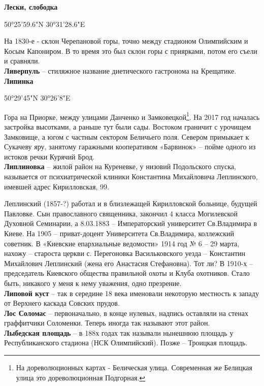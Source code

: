 \textbf{Лески, слободка}

50°25'59.6"N 30°31'28.6"E

На 1830-е - склон Черепановой горы, точно между стадионом Олимпийским и Косым Капониром. В то время это был склон горы с приярками, потом его съели и сравняли.\\

\textbf{Ливерпуль} – стиляжное название диетического гастронома на Крещатике.\\

\textbf{Липинка}

50°29'45"N 30°26'8"E

Гора на Приорке, между улицами Данченко и Замковецкой\footnote{На дореволюционных картах - Белическая улица. Современная же Белицкая улица это дореволюционная Подгорная.}. На 2017 год началась застройка высотками, а раньше тут были сады. Востоком граничит с урочищем Замковище, а югом с частным сектором Беличьего поля. Севером примыкает к Сукачеву яру, занятому гаражными кооперативом «Барвинок» – пойме одного из истоков речки Курячий Брод.\\

\textbf{Липлиновка} – жилой район на Куреневке, у низовий Подольского спуска, называется от психиатрической клиники Константина Михайловича Леплинского, имевшей адрес Кирилловская, 99. 

Леплинский (1857-?) работал и в близлежащей Кирилловской больнице, будущей Павловке. Сын православного священника, закончил 4 класса Могилевской Духовной Семинарии, а 8.03.1883 – Императорский университет Св.Владимира в Киеве. На 1905 – приват-доцент Университета Св.Владимира, коллежский советник. В «Киевские епархиальные ведомости» 1914 год № 6 – 29 марта, нахожу – староста церкви с. Перегоновка Васильковского уезда – Константин Михайлович Леплинский (жена его Анастасия Стефановна). Тот ли? В 1910-х – председатель Киевского общества правильной охоты и Клуба охотников. Стало быть, никакого у меня к нему уважения, одно презрение.\\

\textbf{Липовой куст} – так в середине 18 века именовали некоторую местность к западу от Верхнего каскада Совских прудов.\\

\textbf{Лос Соломас} – первоначально, в конце нулевых, надпись оставляли на стенах граффитчики Соломенки. Теперь иногда так называют этот район.\\

\textbf{Лыбедская площадь} – в 188х годах так называли нынешнюю площадь у Республиканского стадиона (НСК Олимпийский). Позже – Троицкая площадь.\\

